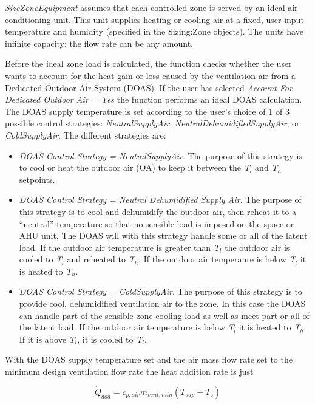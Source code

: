 \emph{SizeZoneEquipment} assumes that each controlled zone is served by an ideal air conditioning unit. This unit supplies heating or cooling air at a fixed, user input temperature and humidity (specified in the Sizing:Zone objects). The units have infinite capacity: the flow rate can be any amount.

Before the ideal zone load is calculated, the function checks whether the user wants to account for the heat gain or loss caused by the ventilation air from a Dedicated Outdoor Air System (DOAS). If the user has selected \emph{Account For Dedicated Outdoor Air = Yes} the function performs an ideal DOAS calculation. The DOAS supply temperature is set according to the user's choice of 1 of 3 possible control strategies: \emph{NeutralSupplyAir}, \emph{NeutralDehumidifiedSupplyAir}, or \emph{ColdSupplyAir}. The different strategies are:

\begin{itemize}
\item
  \emph{DOAS Control Strategy = NeutralSupplyAir}. The purpose of this strategy is to cool or heat the outdoor air (OA) to keep it between the \emph{T\(_{l}\)} and \emph{T\(_{h}\)} setpoints.
\item
  \emph{DOAS Control Strategy = Neutral Dehumidified Supply Air}. The purpose of this strategy is to cool and dehumidify the outdoor air, then reheat it to a ``neutral'' temperature so that no sensible load is imposed on the space or AHU unit. The DOAS will with this strategy handle some or all of the latent load. If the outdoor air temperature is greater than \emph{T\(_{l}\)} the outdoor air is cooled to \emph{T\(_{l}\)} and reheated to \emph{T\(_{h}\)}. If the outdoor air temperaure is below \emph{T\(_{l}\)} it is heated to \emph{T\(_{h}\)}.
\item
  \emph{DOAS Control Strategy = ColdSupplyAir}. The purpose of this strategy is to provide cool, dehumidified ventilation air to the zone. In this case the DOAS can handle part of the sensible zone cooling load as well as meet part or all of the latent load. If the outdoor air temperature is below \emph{T\(_{l}\)} it is heated to \emph{T\(_{h}\)}. If it is above \emph{T\(_{l}\)}, it is cooled to \emph{T\(_{l}\)}.
\end{itemize}

With the DOAS supply temperature set and the air mass flow rate set to the minimum design ventilation flow rate the heat addition rate is just

\begin{equation}
{\dot Q_{doa}} = {c_{p,air}}{\dot m_{vent,min}}({T_{sup}} - {T_z})
\end{equation}

